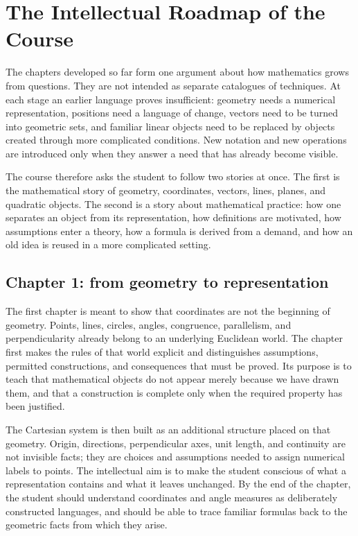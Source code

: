 \section*{The Intellectual Roadmap of the Course}

The chapters developed so far form one argument about how mathematics grows from
questions. They are not intended as separate catalogues of techniques. At each
stage an earlier language proves insufficient: geometry needs a numerical
representation, positions need a language of change, vectors need to be turned
into geometric sets, and familiar linear objects need to be replaced by objects
created through more complicated conditions. New notation and new operations are
introduced only when they answer a need that has already become visible.

The course therefore asks the student to follow two stories at once. The first is
the mathematical story of geometry, coordinates, vectors, lines, planes, and
quadratic objects. The second is a story about mathematical practice: how one
separates an object from its representation, how definitions are motivated, how
assumptions enter a theory, how a formula is derived from a demand, and how an old
idea is reused in a more complicated setting.

\subsection*{Chapter 1: from geometry to representation}

The first chapter is meant to show that coordinates are not the beginning of
geometry. Points, lines, circles, angles, congruence, parallelism, and
perpendicularity already belong to an underlying Euclidean world. The chapter
first makes the rules of that world explicit and distinguishes assumptions,
permitted constructions, and consequences that must be proved. Its purpose is to
teach that mathematical objects do not appear merely because we have drawn them,
and that a construction is complete only when the required property has been
justified.

The Cartesian system is then built as an additional structure placed on that
geometry. Origin, directions, perpendicular axes, unit length, and continuity are
not invisible facts; they are choices and assumptions needed to assign numerical
labels to points. The intellectual aim is to make the student conscious of what a
representation contains and what it leaves unchanged. By the end of the chapter,
the student should understand coordinates and angle measures as deliberately
constructed languages, and should be able to trace familiar formulas back to the
geometric facts from which they arise.

